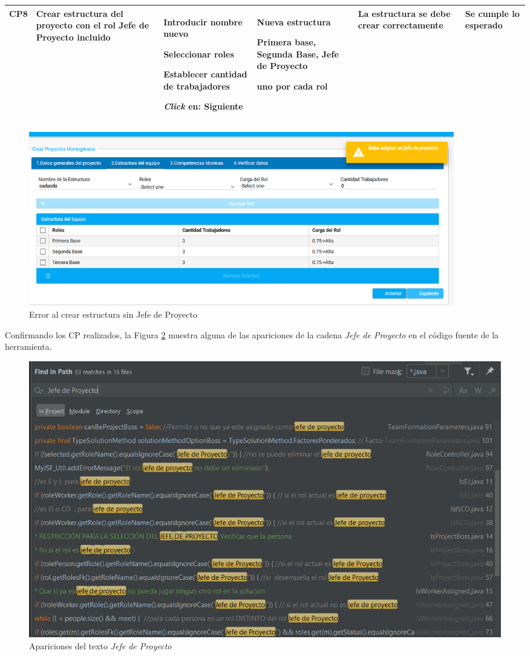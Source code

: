 \begin{table}[H]
{\begin{tabular}{c p{2.3cm} e{4.7cm} e{4cm} p{3cm} p{3cm}}
			CP8 & Crear estructura del proyecto con el rol Jefe de Proyecto incluido & 
			\item Introducir nombre nuevo
			\item Seleccionar roles
			\item Establecer cantidad de trabajadores
			\item \textit{Click} en: Siguiente
			& \item Nueva estructura
			\item Primera base, Segunda Base, Jefe de Proyecto
			\item uno por cada rol  
			& La estructura se debe crear correctamente & Se cumple lo esperado\\ \bottomrule
		\end{tabular}
	}
\end{table}

\begin{figure}[H]
	\centering
	\includegraphics[width=0.9\textwidth]{figuras/error-jefe-proy.png}
	\caption{Error al crear estructura sin Jefe de Proyecto} \label{fig:error-jefe-proy}
\end{figure}

Confirmando los CP realizados, la Figura \ref{fig:apariciones-jefe-proy} muestra alguna de las apariciones de la cadena \textit{Jefe de Proyecto} en el código fuente de la herramienta.

\begin{figure}[H]
	\centering
	\includegraphics[width=\textwidth]{figuras/string-texto-jefe-proy.png}
	\caption{Apariciones del texto \textit{Jefe de Proyecto}} \label{fig:apariciones-jefe-proy}
\end{figure}

